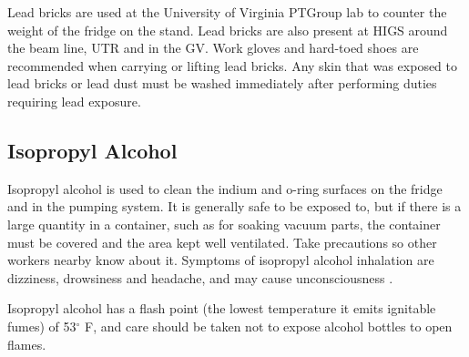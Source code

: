 Lead bricks are used at the University of Virginia PTGroup lab to counter the weight of the fridge on the stand.  Lead bricks are also present at HIGS around the beam line, UTR and in the GV.  Work gloves and hard-toed shoes are recommended when carrying or lifting lead bricks.  Any skin that was exposed to lead bricks or lead dust must be washed immediately after performing duties requiring lead exposure.

\subsection{Isopropyl Alcohol}
Isopropyl alcohol is used to clean the indium and o-ring surfaces on the fridge and in the pumping system.  It is generally safe to be exposed to, but if there is a large quantity in a container, such as for soaking vacuum parts, the container must be covered and the area kept well ventilated.  Take precautions so other workers nearby know about it.  Symptoms of isopropyl alcohol inhalation are dizziness, drowsiness and headache, and may cause unconsciousness \cite{isopropmsds}. 

Isopropyl alcohol has a flash point (the lowest temperature it emits ignitable fumes) of 53$^\circ$ F, and care should be taken not to expose alcohol bottles to open flames.
